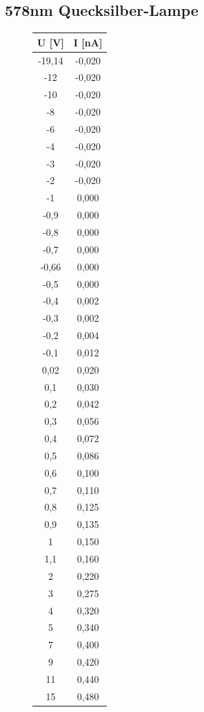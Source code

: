 \documentclass[a4paper, 10pt]{report}%
\begin{document}
\subsection{578nm Quecksilber-Lampe}
\begin{figure}[!htbp]
\begin{minipage}[t]{2cm}
\vspace{0pt}
\centering
\begin{center}
\begin{tabular}{c|c}
U [V] & I [nA] \\
\hline
-19,14&	-0,020 \\
-12&	-0,020 \\
-10&	-0,020 \\
-8&	-0,020 \\
-6&	-0,020 \\
-4&	-0,020 \\
-3&	-0,020 \\
-2&	-0,020 \\
-1&	0,000 \\
-0,9&	0,000 \\
-0,8&	0,000 \\
-0,7&	0,000 \\
-0,66&	0,000 \\
-0,5&	0,000 \\
-0,4&	0,002 \\
-0,3&	0,002 \\
-0,2&	0,004 \\
-0,1&	0,012 \\
0,02&	0,020 \\
0,1&	0,030 \\
0,2&	0,042 \\
0,3&	0,056 \\
0,4&	0,072 \\
0,5&	0,086 \\
0,6&	0,100 \\
0,7&	0,110 \\
0,8&	0,125 \\
0,9&	0,135 \\
1&	0,150 \\
1,1&	0,160 \\
2&	0,220 \\
3&	0,275 \\
4&	0,320 \\
5&	0,340 \\
7&	0,400 \\
9&	0,420 \\
11&	0,440 \\
15&	0,480 \\

\end{tabular}
\end{center}
\end{minipage}
\end{figure}
\end{document}
